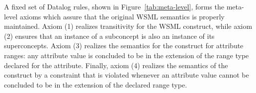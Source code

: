 A fixed set \mlaxioms of Datalog rules, shown in
Figure~\ref{tab:meta-level}, forms the meta-level axioms which
assure that the original WSML semantics is properly maintained.
Axiom (1) realizes transitivity for the WSML 
construct, while axiom (2) ensures that an instance of a
subconcept is also an instance of its superconcepts. Axiom (3)
realizes the semantics for the  construct for
attribute ranges: any attribute value is concluded to be in the
extension of the range type declared for the attribute. Finally,
axiom (4) realizes the semantics of the  construct by
a constraint that is violated whenever an attribute value cannot
be concluded to be in the extension of the declared range type.
